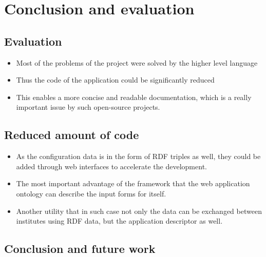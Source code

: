 

\chapter{Conclusion and evaluation}

\section{Evaluation}

\begin{itemize}
	\item Most of the problems of the project were solved by the higher level language 
	\item Thus the code of the application could be significantly reduced
	\item This enables a more concise and readable documentation, which is a really important issue by such open-source projects.
\end{itemize}


\section{Reduced amount of code}

\begin{itemize}
	\item As the configuration data is in the form of RDF triples as well, they could be added through web interfaces to accelerate the development.
	\item The most important advantage of the framework that the web application ontology can describe the input forms for itself. 
	\item Another utility that in such case not only the data can be exchanged between institutes using RDF data, but the application descriptor as well.
\end{itemize}

\section{Conclusion and future work}




